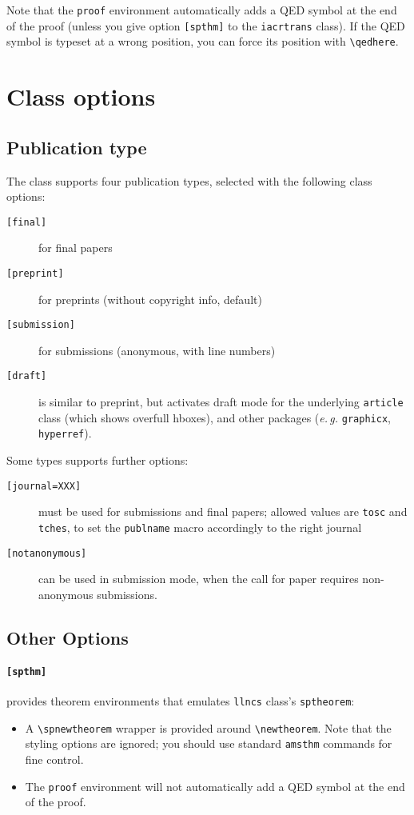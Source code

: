 \documentclass{iacrtrans}
\begin{document}
Note that the \texttt{proof} environment automatically adds a QED
symbol at the end of the proof (unless you give option
\texttt{[spthm]} to the \texttt{iacrtrans} class).  If the QED symbol
is typeset at a wrong position, you can force its position with
\verb+\qedhere+.

\section{Class options}
\label{sec:options}

\subsection{Publication type}

The class supports four publication types, selected with the
following class options:
\begin{description}
\item[\texttt{[final]}] for final papers
\item[\texttt{[preprint]}] for preprints (without copyright info, default)
\item[\texttt{[submission]}] for submissions (anonymous, with line numbers)
\item[\texttt{[draft]}] is similar to preprint, but activates draft
  mode for the underlying \texttt{article} class (which shows overfull hboxes), and other packages
  (\emph{e.\,g.} \texttt{graphicx}, \texttt{hyperref}).
\end{description}
Some types supports further options:
\begin{description}
\item[\texttt{[journal=XXX]}] must be used for submissions and
  final papers; allowed values are \texttt{tosc} and \texttt{tches},
  to set the \texttt{publname} macro accordingly to the right journal
\item[\texttt{[notanonymous]}] can be used in submission mode, when the
  call for paper requires non-anonymous submissions.
\end{description}

\subsection{Other Options}

\paragraph{\texttt{[spthm]}}
provides theorem environments that emulates
\texttt{llncs} class's \texttt{sptheorem}:
\begin{itemize}
\item A \texttt{\textbackslash spnewtheorem} wrapper is provided
  around \AmS{} \texttt{\textbackslash newtheorem}.  Note that the
  styling options are ignored; you should use standard
  \texttt{amsthm} commands for fine control.
\item The \AmS{} \texttt{proof} environment will not automatically add a
  QED symbol at the end of the proof.
\end{itemize}
\end{document}
